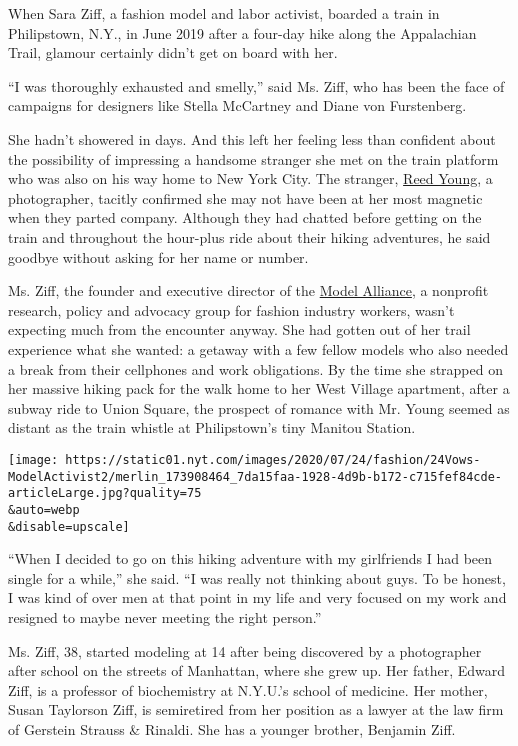 When Sara Ziff, a fashion model and labor activist, boarded a train in
Philipstown, N.Y., in June 2019 after a four-day hike along the
Appalachian Trail, glamour certainly didn't get on board with her.

``I was thoroughly exhausted and smelly,'' said Ms. Ziff, who has been
the face of campaigns for designers like Stella McCartney and Diane von
Furstenberg.

She hadn't showered in days. And this left her feeling less than
confident about the possibility of impressing a handsome stranger she
met on the train platform who was also on his way home to New York City.
The stranger, \href{https://www.reedyoung.com/}{Reed Young}, a
photographer, tacitly confirmed she may not have been at her most
magnetic when they parted company. Although they had chatted before
getting on the train and throughout the hour-plus ride about their
hiking adventures, he said goodbye without asking for her name or
number.

Ms. Ziff, the founder and executive director of the
\href{https://modelalliance.org/}{Model Alliance}, a nonprofit research,
policy and advocacy group for fashion industry workers, wasn't expecting
much from the encounter anyway. She had gotten out of her trail
experience what she wanted: a getaway with a few fellow models who also
needed a break from their cellphones and work obligations. By the time
she strapped on her massive hiking pack for the walk home to her West
Village apartment, after a subway ride to Union Square, the prospect of
romance with Mr. Young seemed as distant as the train whistle at
Philipstown's tiny Manitou Station.

\texttt{[image: https://static01.nyt.com/images/2020/07/24/fashion/24Vows-ModelActivist2/merlin\_173908464\_7da15faa-1928-4d9b-b172-c715fef84cde-articleLarge.jpg?quality=75\\\&auto=webp\\\&disable=upscale]}

``When I decided to go on this hiking adventure with my girlfriends I
had been single for a while,'' she said. ``I was really not thinking
about guys. To be honest, I was kind of over men at that point in my
life and very focused on my work and resigned to maybe never meeting the
right person.''

Ms. Ziff, 38, started modeling at 14 after being discovered by a
photographer after school on the streets of Manhattan, where she grew
up. Her father, Edward Ziff, is a professor of biochemistry at N.Y.U.'s
school of medicine. Her mother, Susan Taylorson Ziff, is semiretired
from her position as a lawyer at the law firm of Gerstein Strauss \&
Rinaldi. She has a younger brother, Benjamin Ziff.

